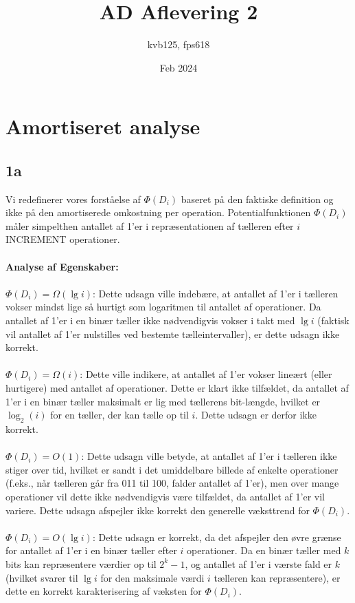 \documentclass{article}
\title{AD Aflevering 2}
\author{kvb125, fps618}
\date{Feb 2024}
\begin{document}
\maketitle

\section{Amortiseret analyse}
\subsection{1a}
Vi redefinerer vores forståelse af $\Phi(D_i)$ baseret på den faktiske definition og ikke på den amortiserede omkostning per operation. Potentialfunktionen $\Phi(D_i)$ måler simpelthen antallet af 1'er i repræsentationen af tælleren efter $i$ INCREMENT operationer.
\\
\\
\textbf{Analyse af Egenskaber:}
\\
\\
$\Phi(D_i)=\Omega(\lg i)$: Dette udsagn ville indebære, at antallet af 1'er i tælleren vokser mindst lige så hurtigt som logaritmen til antallet af operationer. Da antallet af 1'er i en binær tæller ikke nødvendigvis vokser i takt med $\lg i$ (faktisk vil antallet af 1'er nulstilles ved bestemte tælleintervaller), er dette udsagn ikke korrekt.
\\
\\
$\Phi(D_i)=\Omega(i)$: Dette ville indikere, at antallet af 1'er vokser lineært (eller hurtigere) med antallet af operationer. Dette er klart ikke tilfældet, da antallet af 1'er i en binær tæller maksimalt er lig med tællerens bit-længde, hvilket er $\log_2(i)$ for en tæller, der kan tælle op til $i$. Dette udsagn er derfor ikke korrekt.
\\
\\
$\Phi(D_i)=O(1)$: Dette udsagn ville betyde, at antallet af 1'er i tælleren ikke stiger over tid, hvilket er sandt i det umiddelbare billede af enkelte operationer (f.eks., når tælleren går fra 011 til 100, falder antallet af 1'er), men over mange operationer vil dette ikke nødvendigvis være tilfældet, da antallet af 1'er vil variere. Dette udsagn afspejler ikke korrekt den generelle væksttrend for $\Phi(D_i)$.
\\
\\
$\Phi(D_i)=O(\lg i)$: Dette udsagn er korrekt, da det afspejler den øvre grænse for antallet af 1'er i en binær tæller efter $i$ operationer. Da en binær tæller med $k$ bits kan repræsentere værdier op til $2^k-1$, og antallet af 1'er i værste fald er $k$ (hvilket svarer til $\lg i$ for den maksimale værdi $i$ tælleren kan repræsentere), er dette en korrekt karakterisering af væksten for $\Phi(D_i)$.
\end{document}
